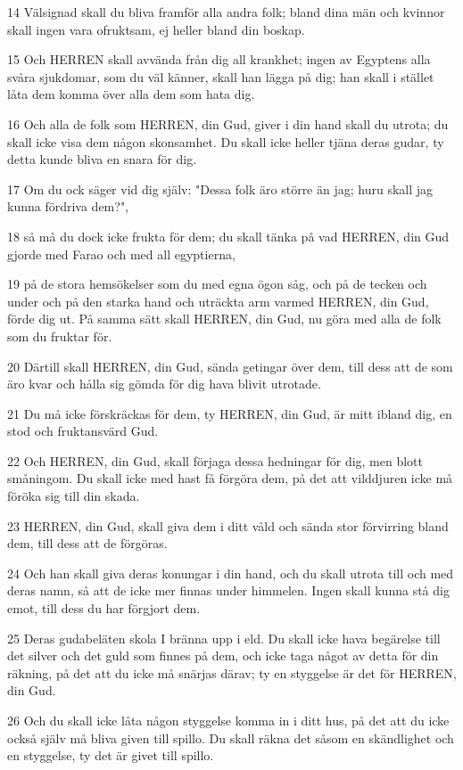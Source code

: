 \par 14 Välsignad skall du bliva framför alla andra folk; bland dina män och kvinnor skall ingen vara ofruktsam, ej heller bland din boskap.
\par 15 Och HERREN skall avvända från dig all krankhet; ingen av Egyptens alla svåra sjukdomar, som du väl känner, skall han lägga på dig; han skall i stället låta dem komma över alla dem som hata dig.
\par 16 Och alla de folk som HERREN, din Gud, giver i din hand skall du utrota; du skall icke visa dem någon skonsamhet. Du skall icke heller tjäna deras gudar, ty detta kunde bliva en snara för dig.
\par 17 Om du ock säger vid dig själv: "Dessa folk äro större än jag; huru skall jag kunna fördriva dem?",
\par 18 så må du dock icke frukta för dem; du skall tänka på vad HERREN, din Gud gjorde med Farao och med all egyptierna,
\par 19 på de stora hemsökelser som du med egna ögon såg, och på de tecken och under och på den starka hand och uträckta arm varmed HERREN, din Gud, förde dig ut. På samma sätt skall HERREN, din Gud, nu göra med alla de folk som du fruktar för.
\par 20 Därtill skall HERREN, din Gud, sända getingar över dem, till dess att de som äro kvar och hålla sig gömda för dig hava blivit utrotade.
\par 21 Du må icke förskräckas för dem, ty HERREN, din Gud, är mitt ibland dig, en stod och fruktansvärd Gud.
\par 22 Och HERREN, din Gud, skall förjaga dessa hedningar för dig, men blott småningom. Du skall icke med hast få förgöra dem, på det att vilddjuren icke må föröka sig till din skada.
\par 23 HERREN, din Gud, skall giva dem i ditt våld och sända stor förvirring bland dem, till dess att de förgöras.
\par 24 Och han skall giva deras konungar i din hand, och du skall utrota till och med deras namn, så att de icke mer finnas under himmelen. Ingen skall kunna stå dig emot, till dess du har förgjort dem.
\par 25 Deras gudabeläten skola I bränna upp i eld. Du skall icke hava begärelse till det silver och det guld som finnes på dem, och icke taga något av detta för din räkning, på det att du icke må snärjas därav; ty en styggelse är det för HERREN, din Gud.
\par 26 Och du skall icke låta någon styggelse komma in i ditt hus, på det att du icke också själv må bliva given till spillo. Du skall räkna det såsom en skändlighet och en styggelse, ty det är givet till spillo.

